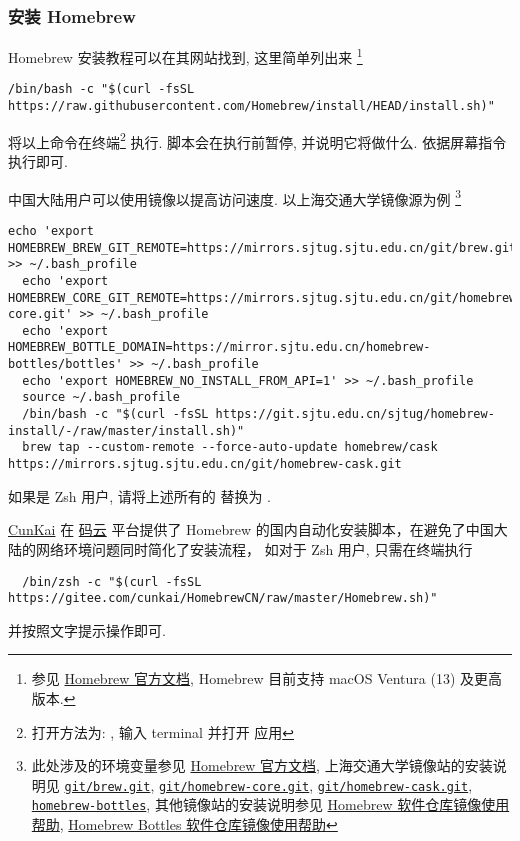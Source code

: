 \subsubsection{安装 Homebrew}

Homebrew 安装教程可以在其网站找到,
这里简单列出来%
\footnote{参见 \href{https://docs.brew.sh/Installation#git-remote-mirroring}{Homebrew 官方文档}, Homebrew 目前支持 macOS Ventura (13) 及更高版本.}
\begin{lstlisting}[deleteemph = bash]
  /bin/bash -c "$(curl -fsSL https://raw.githubusercontent.com/Homebrew/install/HEAD/install.sh)"
\end{lstlisting}
将以上命令在\textsf{终端}\footnote{%
  打开方法为: \keys{\cmdmac + \SPACE}, 输入 \textsf{terminal} 并打开  应用}%
执行.
脚本会在执行前暂停, 并说明它将做什么. 依据屏幕指令执行即可.

中国大陆用户可以使用镜像以提高访问速度.
以上海交通大学镜像源为例%
\footnote{此处涉及的环境变量参见 \href{https://docs.brew.sh/Manpage#environment}{Homebrew 官方文档},
上海交通大学镜像站的安装说明见
\href{https://mirrors.sjtug.sjtu.edu.cn/docs/git/brew.git}{\texttt{git/brew.git}},
\href{https://mirrors.sjtug.sjtu.edu.cn/docs/git/homebrew-core.git}{\texttt{git/homebrew-core.git}},
\href{https://mirrors.sjtug.sjtu.edu.cn/docs/git/homebrew-cask.git}{\texttt{git/homebrew-cask.git}},
\href{https://mirrors.sjtug.sjtu.edu.cn/docs/homebrew-bottles}{\texttt{homebrew-bottles}},
其他镜像站的安装说明参见
\href{https://help.mirrors.cernet.edu.cn/homebrew/}{Homebrew 软件仓库镜像使用帮助},
\href{https://help.mirrors.cernet.edu.cn/homebrew-bottles/}{Homebrew Bottles 软件仓库镜像使用帮助}}
\begin{lstlisting}[deleteemph = bash]
  echo 'export HOMEBREW_BREW_GIT_REMOTE=https://mirrors.sjtug.sjtu.edu.cn/git/brew.git' >> ~/.bash_profile
  echo 'export HOMEBREW_CORE_GIT_REMOTE=https://mirrors.sjtug.sjtu.edu.cn/git/homebrew-core.git' >> ~/.bash_profile
  echo 'export HOMEBREW_BOTTLE_DOMAIN=https://mirror.sjtu.edu.cn/homebrew-bottles/bottles' >> ~/.bash_profile
  echo 'export HOMEBREW_NO_INSTALL_FROM_API=1' >> ~/.bash_profile
  source ~/.bash_profile
  /bin/bash -c "$(curl -fsSL https://git.sjtu.edu.cn/sjtug/homebrew-install/-/raw/master/install.sh)"
  brew tap --custom-remote --force-auto-update homebrew/cask https://mirrors.sjtug.sjtu.edu.cn/git/homebrew-cask.git
\end{lstlisting}
如果是 Zsh 用户, 请将上述所有的  替换为 .

\href{https://gitee.com/cunkai}{CunKai} 在%
\href{https://gitee.com/cunkai/HomebrewCN}{码云}%
平台提供了 Homebrew 的国内自动化安装脚本，在避免了中国大陆的网络环境问题同时简化了安装流程，
如对于 Zsh 用户, 只需在终端执行
\begin{lstlisting}
  /bin/zsh -c "$(curl -fsSL https://gitee.com/cunkai/HomebrewCN/raw/master/Homebrew.sh)"
\end{lstlisting}
并按照文字提示操作即可.

